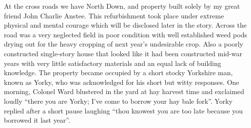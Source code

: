 At the cross roads we have North Down, and property built solely by my great
friend John Charlie Anstee. This refurbishment took place under extreme
physical and mental courage which will be disclosed later in the story. Across
the road was a very neglected field in poor condition with well established
weed pods drying out for the heavy cropping of next year's undesirable crop.
Also a poorly constructed single-story house that looked like it had been
constructed mid-war years with very little satisfactory materials and an equal
lack of building knowledge. The property became occupied by a short stocky
Yorkshire man, known as Yorky, who was acknowledged for his short but witty
responses. One morning, Colonel Ward blustered in the yard at hay harvest time
and exclaimed loudly ``there you are Yorky; I've come to borrow your hay bale
fork''. Yorky replied after a short pause laughing ``thou knowest you are too
late because you borrowed it last year''.

